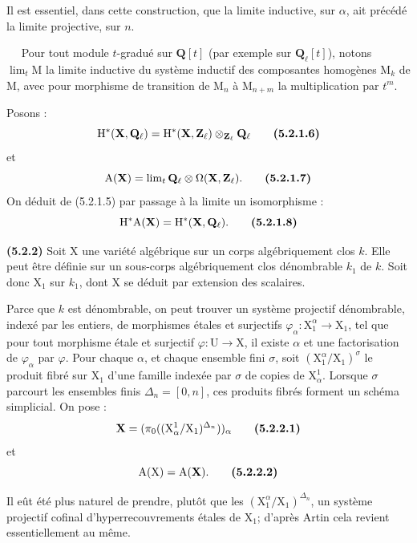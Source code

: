 \documentclass[11pt,leqno]{article}
\newcommand{\Page}[1]{\ifvmode\noindent\else\unskip\ \fi{\footnotesize\textcolor{gray}{[p.\,#1]}}\ \ignorespaces}
\begin{document}
Il est essentiel, dans cette construction, que la limite inductive, sur \(\alpha\), ait précédé la limite projective, sur \(n\).

\Page{238}
Pour tout module \(t\)-gradué sur \(\mathbf{Q}[t]\) (par exemple sur \(\mathbf{Q}_{\ell}[t]\)), notons \(\lim\nolimits_t\mathrm{M}\) la limite inductive du système inductif des composantes homogènes \(\mathrm{M}_k\) de \(\mathrm{M}\), avec pour morphisme de transition de \(\mathrm{M}_n\) à \(\mathrm{M}_{n+m}\) la multiplication par \(t^m\).

Posons :
\[
\mathrm{H}^*(\mathbf{X},\mathbf{Q}_{\ell})
=\mathrm{H}^*(\mathbf{X},\mathbf{Z}_{\ell})
\otimes_{\mathbf{Z}_{\ell}}\mathbf{Q}_{\ell}
\tag*{\textbf{(5.2.1.6)}}
\]
et
\[
\mathrm{A}(\mathbf{X})
=\lim\nolimits_t\mathbf{Q}_{\ell}\otimes\Omega(\mathbf{X},\mathbf{Z}_{\ell}).
\tag*{\textbf{(5.2.1.7)}}
\]
On déduit de (5.2.1.5) par passage à la limite un isomorphisme :
\[
\mathrm{H}^*\mathrm{A}(\mathbf{X})=\mathrm{H}^*(\mathbf{X},\mathbf{Q}_{\ell}).
\tag*{\textbf{(5.2.1.8)}}
\]

\textbf{(5.2.2)} Soit \(\mathrm{X}\) une variété algébrique sur un corps algébriquement clos \(k\). Elle peut être définie sur un sous-corps algébriquement clos dénombrable \(k_1\) de \(k\). Soit donc \(\mathrm{X}_1\) sur \(k_1\), dont \(\mathrm{X}\) se déduit par extension des scalaires.

Parce que \(k\) est dénombrable, on peut trouver un système projectif dénombrable, indexé par les entiers, de morphismes étales et surjectifs \(\varphi_{\alpha}:\mathrm{X}_1^{\alpha}\to\mathrm{X}_1\), tel que pour tout morphisme étale et surjectif \(\varphi:\mathrm{U}\to\mathrm{X}\), il existe \(\alpha\) et une factorisation de \(\varphi_{\alpha}\) par \(\varphi\). Pour chaque \(\alpha\), et chaque ensemble fini \(\sigma\), soit \((\mathrm{X}_1^{\alpha}/\mathrm{X}_1)^{\sigma}\) le produit fibré sur \(\mathrm{X}_1\) d’une famille indexée par \(\sigma\) de copies de \(\mathrm{X}_{\alpha}^{1}\). Lorsque \(\sigma\) parcourt les ensembles finis \(\Delta_n=[0,n]\), ces produits fibrés forment un schéma simplicial. On pose :
\[
\mathbf{X}=(\pi_0((\mathrm{X}_{\alpha}^{1}/\mathrm{X}_1)^{\Delta_n}))_{\alpha}
\tag*{\textbf{(5.2.2.1)}}
\]
et
\[
\mathrm{A}(\mathrm{X})=\mathrm{A}(\mathbf{X}).
\tag*{\textbf{(5.2.2.2)}}
\]

Il eût été plus naturel de prendre, plutôt que les \((\mathrm{X}_1^{\alpha}/\mathrm{X}_1)^{\Delta_n}\), un système projectif cofinal d’hyperrecouvrements étales de \(\mathrm{X}_1\); d’après Artin cela revient essentiellement au même.
\end{document}
